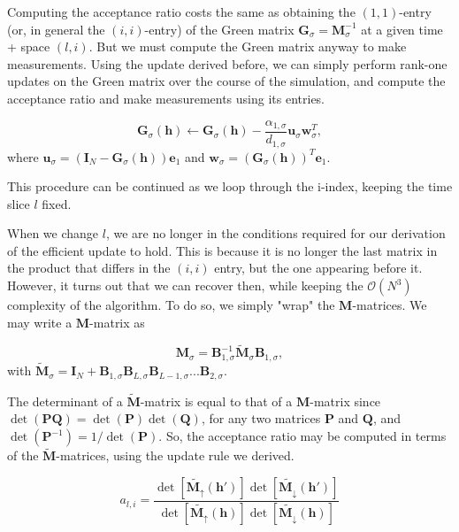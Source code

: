 \documentclass[10pt, twocolumn, twoside]{article}
\begin{document}
Computing the acceptance ratio costs the same as obtaining the $(1,1)$-entry (or, in general the $(i,i)$-entry) of the Green matrix $\bm G_\sigma =\bm M_{\sigma}^{-1}$ at a given time + space $(l, i)$. But we must compute the Green matrix anyway to make measurements. Using the update derived before, we can simply perform rank-one updates on the Green matrix over the course of the simulation, and compute the acceptance ratio and make measurements using its entries.

\begin{equation}
\bm G_\sigma (\bm h) \leftarrow \bm G_\sigma (\bm h) - \frac{\alpha_{1, \sigma}}{d_{1,\sigma}} \bm u_\sigma \bm w_{\sigma}^T ,
\end{equation}
where $\bm u_\sigma = ( \bm I_N - \bm G_\sigma ( \bm h ) ) \bm e_1$ and $\bm w_\sigma = ( \bm G_\sigma (\bm h) )^T \bm e_1$.

This procedure can be continued as we loop through the i-index, keeping the time slice $l$ fixed.

When we change $l$, we are no longer in the conditions required for our derivation of the efficient update to hold. This is because it is no longer the last matrix in the product that differs in the $(i, i)$ entry, but the one appearing before it. However, it turns out that we can recover then, while keeping the $\mathcal{O}(N^3)$ complexity of the algorithm. To do so, we simply "wrap" the $\bm M$-matrices. We may write a $\bm M$-matrix as

\begin{equation}
\bm M_\sigma = \bm B_{1, \sigma}^{-1} \tilde{\bm M}_\sigma \bm B_{1, \sigma} ,
\end{equation}
with $\tilde{\bm M}_\sigma = \bm I_N + \bm B_{1, \sigma} \bm B_{L, \sigma} \bm B_{L-1, \sigma} ... \bm B_{2, \sigma}$.

The determinant of a $\tilde{\bm M}$-matrix is equal to that of a $\bm M$-matrix since $\det(\bm P \bm Q) = \det (\bm P) \det (\bm Q)$, for any two matrices $\bm P$ and $\bm Q$, and $\det (\bm  P^{-1} ) = 1 / \det (\bm P) $. So, the acceptance ratio may be computed in terms of the $\tilde{\bm M}$-matrices, using the update rule we derived.

\begin{equation}
a_{l, i} = \frac{\det [ \tilde{\bm M_\uparrow} (\bm h') ] \det [ \tilde{\bm M_\downarrow} (\bm h') ]}{\det [ \tilde{\bm M_\uparrow} (\bm h) ] \det [ \tilde{\bm M_\downarrow} (\bm h) ]}
\end{equation}
\end{document}
